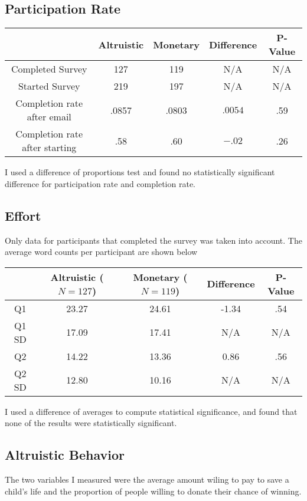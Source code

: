 \documentclass[12pt]{article}
\begin{document}
\subsection{Participation Rate}
\begin{center}
    \begin{tabular}{c| c c | c c}
         & \textbf{Altruistic} & \textbf{Monetary} & \textbf{Difference} & \textbf{P-Value}\\
         \hline
         Completed Survey & 127 & 119 & N/A & N/A \\
         Started Survey & 219 & 197 & N/A & N/A \\
         Completion rate after email  & .0857 & .0803  & $.0054$ & .59\\
         Completion rate after starting & .58 & .60 & $-.02$ & .26
    \end{tabular}
\end{center}
I used a difference of proportions test and found no statistically significant difference for participation rate and completion rate. 

\subsection{Effort}
Only data for participants that completed the survey was taken into account. The average word counts per participant are shown below

\begin{center}
    \begin{tabular}{c| c c | c c}
         & \parbox[t]{2cm}{\textbf{Altruistic}\\($N = 127$)} & \parbox[t]{2cm}{\textbf{Monetary}\\($N = 119$)} & \textbf{Difference} & \textbf{P-Value}\\
         \hline
         Q1 & 23.27 & 24.61 & -1.34 & .54 \\
         Q1 SD & 17.09 & 17.41 & N/A & N/A \\
         Q2 & 14.22 & 13.36 & 0.86 & .56 \\
         Q2 SD & 12.80 & 10.16 & N/A & N/A
    \end{tabular}
\end{center}
I used a difference of averages to compute statistical significance, and found that none of the results were statistically significant. 

\subsection{Altruistic Behavior}
The two variables I measured were the average amount wiling to pay to save a child's life and the proportion of people willing to donate their chance of winning. 
\end{document}
